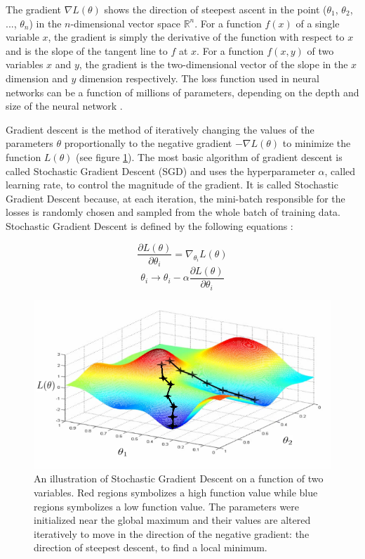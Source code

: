 \documentclass[a4paper, twoside]{article}
\newcommand*{\pd}[2]{\ensuremath{\dfrac{\partial #1}{\partial #2}}}
\begin{document}
The gradient $\nabla L(\theta)$ shows the direction of steepest ascent in the point ($\theta_{1}$, $\theta_{2}$, ..., $\theta_{n}$) in the $n$-dimensional vector space $\mathbb{R}^{n}$. For a function $f(x)$ of a single variable $x$, the gradient is simply the derivative of the function with respect to $x$ and is the slope of the tangent line to $f$ at $x$. For a function $f(x,y)$ of two variables $x$ and $y$, the gradient is the two-dimensional vector of the slope in the $x$ dimension and $y$ dimension respectively. The loss function used in neural networks can be a function of millions of parameters, depending on the depth and size of the neural network \cite{gradient} \cite{convmath}.

Gradient descent is the method of iteratively changing the values of the parameters $\theta$ proportionally to the negative gradient $-\nabla L(\theta)$ to minimize the function $L(\theta)$ (see figure \ref{figSGD}). The most basic algorithm of gradient descent is called Stochastic Gradient Descent (SGD) and uses the hyperparameter $\alpha$, called learning rate, to control the magnitude of the gradient. It is called Stochastic Gradient Descent because, at each iteration, the mini-batch responsible for the losses is randomly chosen and sampled from the whole batch of training data. Stochastic Gradient Descent is defined by the following equations \cite{wikiStanford} \cite{gradient} \cite{convmath}:

\begin{equation}\label{EQgradient}
\pd{L(\theta)}{\theta_i} = \nabla_{\theta_i} L(\theta)
\end{equation}
\begin{equation}\label{SGD}
{\theta_i} \to {\theta_i} - \alpha \pd{L(\theta)}{\theta_i}
\end{equation}

\begin{figure}[h]
	\centering
  		\includegraphics[scale=1]{gradient-descent.png}
  	\caption{An illustration \cite{figSGD} of Stochastic Gradient Descent on a function of two variables. Red regions symbolizes a high function value while blue regions symbolizes a low function value. The parameters were initialized near the global maximum and their values are altered iteratively to move in the direction of the negative gradient: the direction of steepest descent, to find a local minimum.} \label{figSGD}
\end{figure}
\end{document}
